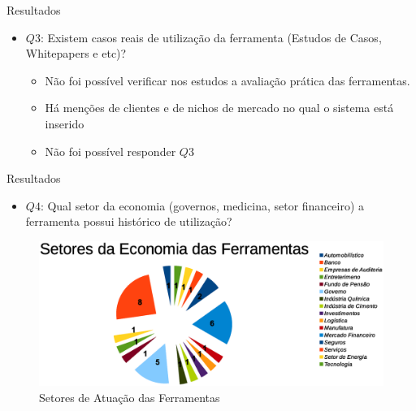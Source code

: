 \documentclass[t,14pt,mathserif]{beamer}
\begin{document}
\begin{frame}{Resultados}
    \begin{itemize}
         \item $Q3$: Existem casos reais de utilização da ferramenta
    (Estudos de Casos, Whitepapers e etc)?
         \begin{itemize}
               \item Não foi possível verificar nos estudos a avaliação prática das
        ferramentas.
              \item Há menções de clientes e de nichos de mercado no qual o sistema
        está inserido
              \item Não foi possível responder $Q3$
       \end{itemize}
    \end{itemize}
\end{frame}
\begin{frame}{Resultados}
    \begin{itemize}
      \item $Q4$: Qual setor da economia
  (governos, medicina, setor financeiro) a ferramenta possui histórico de
  utilização?
    \end{itemize}

\begin{figure}[htb]
\centering
\includegraphics[width=.9\textwidth]{../img/graph_setores.eps}
\caption{Setores de Atuação das Ferramentas}
\label{fig:setores}
\end{figure}

\end{frame}
\end{document}
